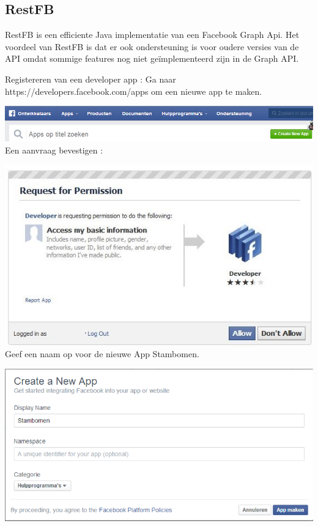 \documentclass[pdftex,a4paper,12pt,twoside]{report}
\begin{document}
\subsection{RestFB}

RestFB is een efficiente Java implementatie van een Facebook Graph Api.
Het voordeel van RestFB is dat er ook ondersteuning is voor oudere versies van de API omdat sommige features nog niet geïmplementeerd zijn in de Graph API.

Registereren van een developer app :
Ga naar https://developers.facebook.com/apps om een nieuwe app te maken.

 \includegraphics{images/facebook4.png}\\
 
 Een aanvraag bevestigen : 
 
 \includegraphics{images/facebook.png}\\
 
 Geef een naam op voor de nieuwe App Stambomen.
 
 \includegraphics{images/facebook2.png}\\
 
\end{document}

